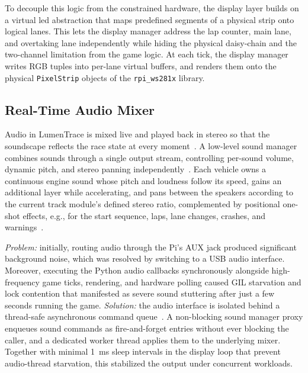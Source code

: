 \documentclass[10pt,journal,final,a4paper]{IEEEtran}
\begin{document}
To decouple this logic from the constrained hardware, the display layer builds on a virtual led abstraction that maps predefined segments of a physical strip onto logical lanes. This lets the display manager address the lap counter, main lane, and overtaking lane independently while hiding the physical daisy-chain and the two-channel limitation from the game logic. At each tick, the display manager writes RGB tuples into per-lane virtual buffers, and renders them onto the physical \texttt{PixelStrip} objects of the \texttt{rpi\_ws281x} library.

\subsection{Real-Time Audio Mixer}
\label{subsec:real-time-audio-mixer}


Audio in LumenTrace is mixed live and played back in stereo so that the soundscape reflects the race state at every moment~\cite{gardenfors:2003designing,gan:2019self}. 
A low-level sound manager combines sounds through a single output stream, controlling per-sound volume, dynamic pitch, and stereo panning independently~\cite{geier:2024sounddevice,bechtold:2026soundfile,harris:2020array}. Each vehicle owns a continuous engine sound whose pitch and loudness follow its speed, gains an additional layer while accelerating, and pans between the speakers according to the current track module's defined stereo ratio, complemented by positional one-shot effects, e.g., for the start sequence, laps, lane changes, crashes, and warnings~\cite{pixabay:2026pixabay}.

\textit{Problem:} initially, routing audio through the Pi's AUX jack produced significant background noise, which was resolved by switching to a USB audio interface. Moreover, executing the Python audio callbacks synchronously alongside high-frequency game ticks, rendering, and hardware polling caused GIL starvation and lock contention that manifested as severe sound stuttering after just a few seconds running the game. 
\textit{Solution:} the audio interface is isolated behind a thread-safe asynchronous command queue~\cite{tsigas:2001simple,eggen:2019thread}. A non-blocking sound manager proxy enqueues sound commands as fire-and-forget entries without ever blocking the caller, and a dedicated worker thread applies them to the underlying mixer. Together with minimal \SI{1}{\milli\second} sleep intervals in the display loop that prevent audio-thread starvation, this stabilized the output under concurrent workloads.
\end{document}
